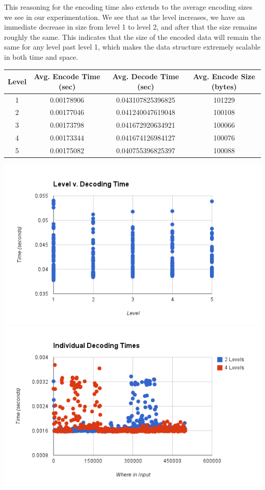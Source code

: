 \documentclass{article}
\begin{document}
This reasoning for the encoding time also extends to the average encoding sizes we see in our experimentation. We see that as the level increases, we have an immediate decrease in size from level 1 to level 2, and after that the size remains roughly the same. This indicates that the size of the encoded data will remain the same for any level past level 1, which makes the data structure extremely scalable in both time and space. 

\begin{center}\smallskip
    \begin{tabular}{ | c | c | c | c |}
    \hline
    Level & Avg. Encode Time (sec) & Avg. Decode Time (sec) & Avg. Encode Size (bytes) \\ \hline
    1 & 0.00178906 & 0.043107825396825 & 101229\\
    2 & 0.00177046 & 0.041240047619048 & 100108\\
    3 & 0.00173798 & 0.041672920634921 & 100066\\
    4 & 0.00173344 & 0.041674126984127 & 100076\\
    5 & 0.00175082 & 0.040755396825397 & 100088\\ \hline
    \end{tabular}
\end{center}

\includegraphics[scale=0.4]{images/betterlevel_v_decode}
\includegraphics[scale=0.4]{images/individual_decodetime}
\afterpage{\vfill}
\end{document}
